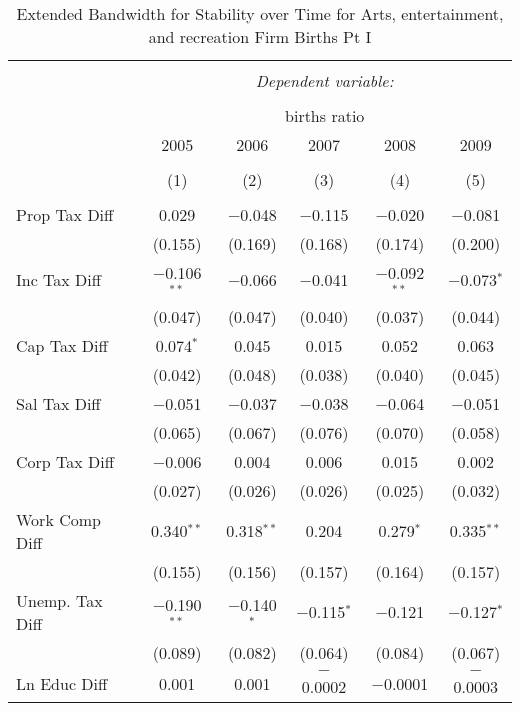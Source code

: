 
\begin{table}[!htbp] \centering 
  \caption{Extended Bandwidth for Stability over Time for  Arts, entertainment, and recreation Firm Births Pt I} 
  \label{71year_eb} 
\small 
\begin{tabular}{@{\extracolsep{5pt}}lccccc} 
\\[-1.8ex]\hline 
\hline \\[-1.8ex] 
 & \multicolumn{5}{c}{\textit{Dependent variable:}} \\ 
\cline{2-6} 
\\[-1.8ex] & \multicolumn{5}{c}{births ratio} \\ 
 & 2005 & 2006 & 2007 & 2008 & 2009 \\ 
\\[-1.8ex] & (1) & (2) & (3) & (4) & (5)\\ 
\hline \\[-1.8ex] 
 Prop Tax Diff & 0.029 & $-$0.048 & $-$0.115 & $-$0.020 & $-$0.081 \\ 
  & (0.155) & (0.169) & (0.168) & (0.174) & (0.200) \\ 
  Inc Tax Diff & $-$0.106$^{**}$ & $-$0.066 & $-$0.041 & $-$0.092$^{**}$ & $-$0.073$^{*}$ \\ 
  & (0.047) & (0.047) & (0.040) & (0.037) & (0.044) \\ 
  Cap Tax Diff & 0.074$^{*}$ & 0.045 & 0.015 & 0.052 & 0.063 \\ 
  & (0.042) & (0.048) & (0.038) & (0.040) & (0.045) \\ 
  Sal Tax Diff & $-$0.051 & $-$0.037 & $-$0.038 & $-$0.064 & $-$0.051 \\ 
  & (0.065) & (0.067) & (0.076) & (0.070) & (0.058) \\ 
  Corp Tax Diff & $-$0.006 & 0.004 & 0.006 & 0.015 & 0.002 \\ 
  & (0.027) & (0.026) & (0.026) & (0.025) & (0.032) \\ 
  Work Comp Diff & 0.340$^{**}$ & 0.318$^{**}$ & 0.204 & 0.279$^{*}$ & 0.335$^{**}$ \\ 
  & (0.155) & (0.156) & (0.157) & (0.164) & (0.157) \\ 
  Unemp. Tax Diff & $-$0.190$^{**}$ & $-$0.140$^{*}$ & $-$0.115$^{*}$ & $-$0.121 & $-$0.127$^{*}$ \\ 
  & (0.089) & (0.082) & (0.064) & (0.084) & (0.067) \\ 
  Ln Educ Diff & 0.001 & 0.001 & $-$0.0002 & $-$0.0001 & $-$0.0003 \\ 

\end{tabular}
\end{table}
